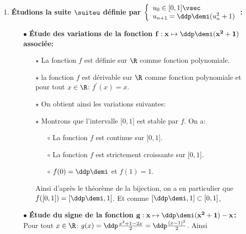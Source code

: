 \begin{correction} \;
\begin{enumerate}
\item \textbf{\'Etudions la suite $\mathbf{\suiteu}$ d\'efinie par $\mathbf{\left\lbrace\begin{array}{l}
u_0\in\lbrack 0,1\rbrack\vsec\\
u_{n+1}=\ddp\demi(u_n^2+1)
\end{array}\right.}$:}
\begin{itemize}
\item[$\bullet$] \textbf{\'Etude des variations de la fonction $\mathbf{f: x\mapsto \ddp\demi(x^2+1)}$ associ\'ee:}
\begin{itemize}
\item[$\star$] La fonction $f$ est d\'efinie sur $\R$ comme fonction polynomiale.
\item[$\star$] la fonction $f$ est d\'erivable sur $\R$ comme fonction polynomiale et pour tout $x\in\R$: $f^{\prime}(x)=x$.
\item[$\star$] On obtient ainsi les variations suivantes:
\begin{center}
\end{center}
\item[$\star$] Montrons que l'intervalle $\lbrack 0,1\rbrack$ est stable par $f$. On a:
\begin{itemize}
\item[$\circ$] La fonction $f$ est continue sur $\lbrack 0,1\rbrack$.
\item[$\circ$] La fonction $f$ est strictement croissante sur $\lbrack 0,1\rbrack$.
\item[$\circ$] $f(0)=\ddp\demi$ et $f(1)=1$.
\end{itemize}
Ainsi d'apr\`{e}s le th\'eor\`{e}me de la bijection, on a en particulier que $f(\lbrack 0,1\rbrack)=\left\lbrack \ddp\demi,1\right\rbrack$. Et comme $\left\lbrack \ddp\demi,1\right\rbrack \subset \lbrack 0,1\rbrack$,  
\end{itemize}
\item[$\bullet$] \textbf{\'Etude du signe de la fonction $\mathbf{g: x\mapsto \ddp\demi(x^2+1)-x}$:}\\
\noindent Pour tout $x\in\R$: $g(x)=\ddp\frac{x^2+1-2x}{2}=\ddp\frac{(x-1)^2}{2}$. Ainsi


\end{itemize}
\end{enumerate}
\end{correction}
